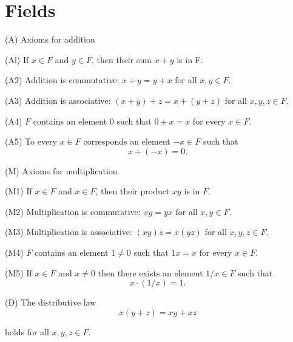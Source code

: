 
\section{Fields}

\begin{myDef}\label{myDef:1.12}

(A) Axioms for addition

(Al) If $x\in F$  and $y \in F$, then their sum \(x + y\) is in F.

(A2) Addition is commutative: \(x + y=y+ x\) for all \(x, y \in F\).

(A3) Addition is associative: \((x+ y)+z = x + (y+ z)\) for all \(x, y, z \in F\).

(A4) $F$ contains an element $0$ such that $0 + x = x$ for every $x \in F$.

(A5) To every $x\in F$ corresponds an element $-x\in F$ such that
\begin{equation*}
    x+(-x)=0.
\end{equation*}

(M) Axioms for multiplication

(M1) If $x\in F$ and $x\in F$, then their product $xy$ is in $F$.

(M2) Multiplication is commutative: $xy = yx$ for all $x, y \in  F$.

(M3) Multiplication is associative: $(xy)z = x(yz)$ for all $x, y, z \in  F$.

(M4) $F$ contains an element $1 \neq 0$ such that $1x = x$ for every $x \in F$.

(M5) If $x \in F$ and $x \neq 0$ then there exists an element $1/x \in F$ such that
\begin{equation*}
    x\cdot(1/x)=1.
\end{equation*}

(D) The distributive law
\begin{equation*}
    x(y+z)=xy+ xz
\end{equation*}

holds for all $x, y, z \in F$.
\end{myDef}

